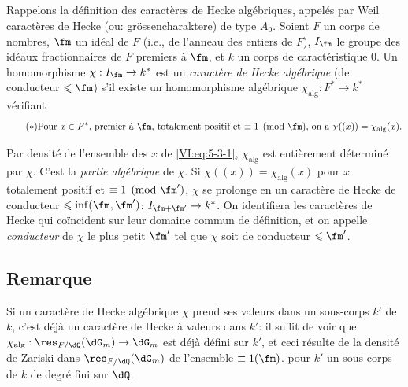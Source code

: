 \subsection{}\label{VI:5-3}

Rappelons la définition des caractères de Hecke algébriques, appelés 
par Weil caractères de Hecke (ou: gr\"ossencharaktere) de type $A_0$. Soient $F$ 
un corps de nombres, $\fm$ un idéal de $F$ (i.e., de l'anneau des entiers de 
$F$), $I_\fm$ le groupe des idéaux fractionnaires de $F$ premiers à $\fm$, 
et $k$ un corps de caractéristique $0$. Un homomorphisme 
$\chi:I_\fm \to k^\ast$ est un \emph{caractère de Hecke algébrique} (de 
conducteur $\leqslant \fm$) s'il existe un homomorphisme algébrique 
$\chi_\text{alg}:F^\ast \to k^\ast$ vérifiant 
\begin{equation*}\tag{$*$}\label{VI:eq:5-3-1}
\text{Pour $x\in F^\ast$, premier à $\fm$, totalement positif et 
$\equiv 1\pmod\fm$, on a $\chi((x))=\chi_\text{alg}(x)$.}
\end{equation*}

Par densité de l'ensemble des $x$ de \eqref{VI:eq:5-3-1}, $\chi_\text{alg}$ 
est entièrement déterminé par $\chi$. C'est la \emph{partie algébrique} 
de $\chi$. Si $\chi((x))=\chi_\text{alg}(x)$ pour $x$ totalement positif et 
$\equiv 1\pmod{\fm'}$, $\chi$ se prolonge en un caractère de Hecke de 
conducteur $\leqslant \inf(\fm,\fm')$: $I_{\fm+\fm'}\to k^\ast$. On 
identifiera les caractères de Hecke qui coïncident sur leur domaine commun de 
définition, et on appelle \emph{conducteur} de $\chi$ le plus petit $\fm'$ 
tel que $\chi$ soit de conducteur $\leqslant \fm'$. 






\subsection{Remarque}\label{VI:5-4}

Si un caractère de Hecke algébrique $\chi$ prend ses valeurs dans un 
sous-corps $k'$ de $k$, c'est déjà un caractère de Hecke à valeurs dans 
$k'$: il suffit de voir que $\chi_\text{alg}:\res_{F/\dQ}(\dG_m) \to \dG_m$ 
est déjà défini sur $k'$, et ceci résulte de la densité de Zariski 
dans $\res_{F/\dQ}(\dG_m)$ de l'ensemble  
$\equiv 1(\fm)$.  pour $k'$ un sous-corps de $k$ de 
degré fini sur $\dQ$. 





